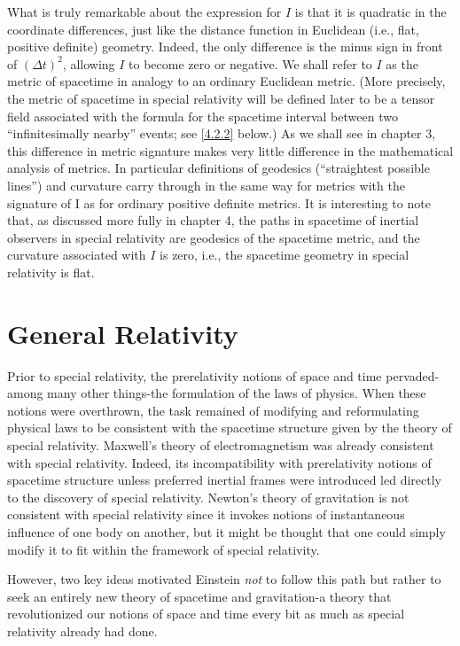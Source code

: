 What is truly remarkable about the expression for $I$ is that it is quadratic in the coordinate differences, just like the distance function in Euclidean (i.e., flat, positive definite) geometry. Indeed, the only difference is the minus sign in front of $(\Delta t)^2$, allowing $I$ to become zero or negative. We shall refer to $I$ as the metric of spacetime in analogy to an ordinary Euclidean metric. (More precisely, the metric of spacetime in special relativity will be defined later to be a tensor field associated with the formula for the spacetime interval between two ``infinitesimally nearby'' events; see \eqref{4.2.2} below.) As we shall see in chapter 3, this difference in metric signature makes very little difference in the mathematical analysis of metrics. In particular definitions of geodesics (``straightest possible lines'') and curvature carry through in the same way for metrics with the signature of I as for ordinary positive definite metrics. It is interesting to note that, as discussed more fully in chapter 4, the paths in spacetime of inertial observers in special relativity are geodesics of the spacetime metric, and the curvature associated with $I$ is zero, i.e., the spacetime geometry in special relativity is flat.

\section{General Relativity}
Prior to special relativity, the prerelativity notions of space and time pervaded-among many other things-the formulation of the laws of physics. When these notions were overthrown, the task remained of modifying and reformulating physical laws to be consistent with the spacetime structure given by the theory of special relativity. Maxwell's theory of electromagnetism was already consistent with special relativity. Indeed, its incompatibility with prerelativity notions of spacetime structure unless preferred inertial frames were introduced led directly to the discovery of special relativity. Newton's theory of gravitation is not consistent with special relativity since it invokes notions of instantaneous influence of one body on another, but it might be thought that one could simply modify it to fit within the framework of special relativity.

However, two key ideas motivated Einstein \emph{not} to follow this path but rather to seek an entirely new theory of spacetime and gravitation-a theory that revolutionized our notions of space and time every bit as much as special relativity already had done.

